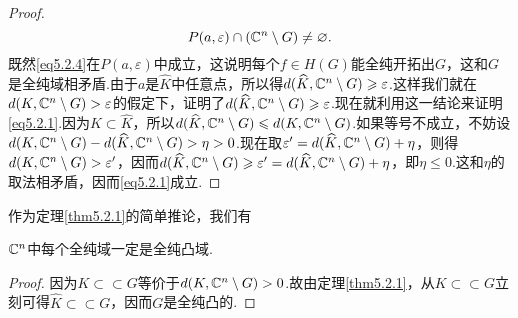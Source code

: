 \begin{proof}
\[P(a,\varepsilon)\cap (\mathbb C^n\setminus G)\neq\varnothing.\]
既然\eqref{eq5.2.4}在$P(a,\varepsilon)$中成立，这说明每个$f\in H(G)$能全纯开拓出$G$，这和$G$是全纯域相矛盾.由于$a$是$\widehat{K}$中任意点，所以得$d(\widehat{K},\mathbb C^n\setminus G)\geqslant\varepsilon$.这样我们就在$d(K,\mathbb C^n\setminus G)>\varepsilon$的假定下，证明了$d(\widehat{K},\mathbb C^n\setminus G)\geqslant\varepsilon$.现在就利用这一结论来证明\eqref{eq5.2.1}.因为$K\subset\widehat{K}$，所以$d(\widehat{K},\mathbb C^n\setminus G)\leqslant d(K,\mathbb C^n\setminus G)$.如果等号不成立，不妨设$d(K,\mathbb C^n\setminus G)-d(\widehat{K},\mathbb C^n\setminus G)>\eta>0$.现在取$\varepsilon'=d(\widehat{K},\mathbb C^n\setminus G)+\eta$，则得$d(K,\mathbb C^n\setminus G)>\varepsilon'$，因而$d(\widehat{K},\mathbb C^n\setminus G)\geqslant\varepsilon'=d(\widehat{K},\mathbb C^n\setminus G)+\eta$，即$\eta\le0$.这和$\eta$的取法相矛盾，因而\eqref{eq5.2.1}成立.
\end{proof}
作为定理\ref{thm5.2.1}的简单推论，我们有
\begin{theorem}\label{thm5.2.2}
	$\mathbb C^n$中每个全纯域一定是全纯凸域.
\end{theorem}
\begin{proof}
	因为$K\subset\subset G$等价于$d(K,\mathbb C^n\setminus G)>0$.故由定理\ref{thm5.2.1}，从$K\subset\subset G$立刻可得$\widehat{K}\subset\subset G$，因而$G$是全纯凸的.
\end{proof}
